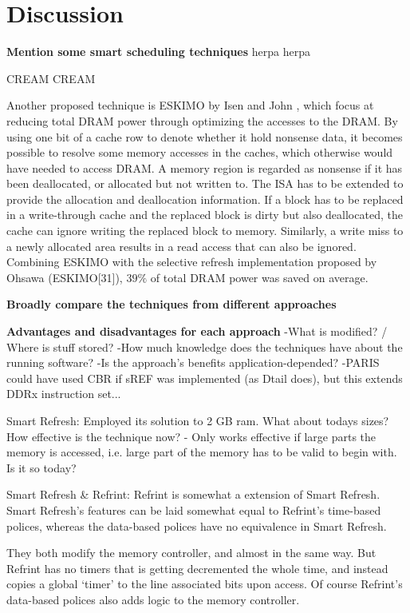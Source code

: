 \section{Discussion} 
\label{sec:disc}


\textbf{Mention some smart scheduling techniques}
herpa herpa

CREAM CREAM \cite{cream}

Another proposed technique is ESKIMO by Isen and John \cite{eskimo}, which focus at reducing total DRAM power through optimizing the accesses to the DRAM. By using one bit of a cache row to denote whether it hold nonsense data, it becomes possible to resolve some memory accesses in the caches, which otherwise would have needed to access DRAM. A memory region is regarded as nonsense if it has been deallocated, or allocated but not written to. The ISA has to be extended to provide the allocation and deallocation information. If a block has to be replaced in a write-through cache and the replaced block is dirty but also deallocated, the cache can ignore writing the replaced block to memory. Similarly, a write miss to a newly allocated area results in a read access that can also be ignored. Combining ESKIMO with the selective refresh implementation proposed by Ohsawa \cite{ohsawa} (ESKIMO[31]), $39\%$ of total DRAM power was saved on average.

\textbf{Broadly compare the techniques from different approaches}



\textbf{Advantages and disadvantages for each approach}
-What is modified? / Where is stuff stored?
-How much knowledge does the techniques have about the running software?
-Is the approach's benefits application-depended?
-PARIS could have used CBR if sREF was implemented (as Dtail does), but this extends DDRx instruction set...

Smart Refresh:
Employed its solution to 2 GB ram. What about todays sizes? How effective is the technique now? - Only works effective if large parts the memory is accessed, i.e. large part of the memory has to be valid to begin with. Is it so today?

Smart Refresh \& Refrint:
Refrint is somewhat a extension of Smart Refresh. Smart Refresh's features can be laid somewhat equal to Refrint's time-based polices, whereas the data-based polices have no equivalence in Smart Refresh.

They both modify the memory controller, and almost in the same way. But Refrint has no timers that is getting decremented the whole time, and instead copies a global `timer' to the line associated bits upon access. Of course Refrint's data-based polices also adds logic to the memory controller.

